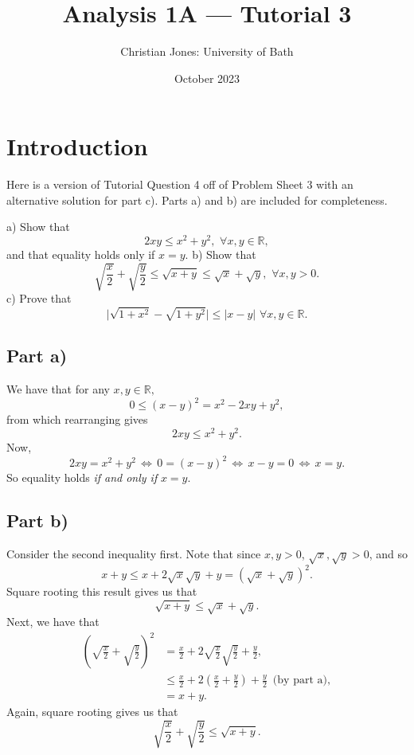 \documentclass[
  12pt,
  a4paper]{extarticle}
\title{Analysis 1A --- Tutorial 3}
\author{Christian Jones: University of Bath}
\date{October 2023}
\theoremstyle{plain}
\theoremstyle{definition}
\theoremstyle{plain}
\theoremstyle{plain}
\theoremstyle{plain}
\theoremstyle{plain}
\theoremstyle{definition}
\theoremstyle{definition}
\theoremstyle{remark}
\theoremstyle{remark}
\let\BeginKnitrBlock\begin \let\EndKnitrBlock\end
\renewcommand{\;}{\,}
\begin{document}
\maketitle

{
\setcounter{tocdepth}{2}
\tableofcontents
}
\newpage
{}

\hypertarget{introduction}{%
\section*{Introduction}\label{introduction}}

Here is a version of Tutorial Question 4 off of Problem Sheet 3 with an alternative solution for part c). Parts a) and b) are included for completeness.

\BeginKnitrBlock{example}[PS3 Question 4]
{\label{exm:ex1} }a) Show that \[ 2xy \leq x^2 + y^2, \;\; \forall x,y \in \mathbb{R},\] and that equality holds only if \(x = y\).
b) Show that \[\sqrt{\frac{x}{2}} + \sqrt{\frac{y}{2}} \leq \sqrt{x + y} \leq \sqrt{x} + \sqrt{y}, \;\; \forall x,y > 0.\]
c) Prove that \[\lvert \sqrt{1 + x^2} - \sqrt{1 + y^2} \rvert \leq \lvert x - y \rvert \;\; \forall x,y \in \mathbb{R}.\]
\EndKnitrBlock{example}

\hypertarget{part-a}{%
\subsection*{Part a)}\label{part-a}}

\BeginKnitrBlock{solution*}
We have that for any \(x,y\in\mathbb{R},\) \[ 0 \leq (x-y)^2 = x^2 - 2xy + y^2,\] from which rearranging gives \[2xy \leq x^2 + y^2.\] Now, \[2xy = x^2 + y^2\; \Leftrightarrow\; 0 = (x-y)^2 \;\Leftrightarrow \;x-y = 0 \;\Leftrightarrow\; x=y.\] So equality holds \emph{if and only if} \(x = y.\)
\EndKnitrBlock{solution*}

\hypertarget{part-b}{%
\subsection*{Part b)}\label{part-b}}

\BeginKnitrBlock{solution*}
Consider the second inequality first. Note that since \(x,y > 0\), \(\sqrt{x}, \sqrt{y} > 0\), and so \[x + y \leq x + 2\sqrt{x}\sqrt{y} + y = (\sqrt{x} + \sqrt{y})^2.\] Square rooting this result gives us that \[\sqrt{x + y} \leq \sqrt{x} + \sqrt{y}.\] Next, we have that
\begin{align*}
\left(\sqrt{\frac{x}{2}} + \sqrt{\frac{y}{2}}\right)^2 &= \frac{x}{2} + 2\sqrt{\frac{x}{2}}\sqrt{\frac{y}{2}} + \frac{y}{2},\\
&\leq \frac{x}{2} + 2\left(\frac{x}{2} + \frac{y}{2}\right) + \frac{y}{2} \;\;\; \text{(by part a)},\\
&= x + y.
\end{align*}
Again, square rooting gives us that \[\sqrt{\frac{x}{2}} + \sqrt{\frac{y}{2}} \leq \sqrt{x + y}.\]
\EndKnitrBlock{solution*}
\end{document}
